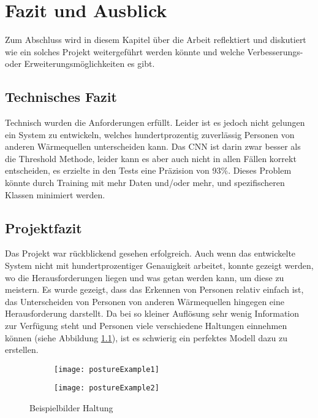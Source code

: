 \chapter{Fazit und Ausblick}
\label{ch:Ausblick}

Zum Abschluss wird in diesem Kapitel über die Arbeit reflektiert und diskutiert wie ein solches Projekt weitergeführt werden könnte und welche Verbesserungs- oder Erweiterungsmöglichkeiten es gibt.

\section{Technisches Fazit}

Technisch wurden die Anforderungen erfüllt. Leider ist es jedoch nicht gelungen ein System zu entwickeln, welches hundertprozentig zuverlässig Personen von anderen Wärmequellen unterscheiden kann. Das \gls{CNN} ist darin zwar besser als die Threshold Methode, leider kann es aber auch nicht in allen Fällen korrekt entscheiden, es erzielte in den Tests eine Präzision von 93\%. Dieses Problem könnte durch Training mit mehr Daten und/oder mehr, und spezifischeren Klassen minimiert werden.

\section{Projektfazit}

Das Projekt war rückblickend gesehen erfolgreich. Auch wenn das entwickelte System nicht mit hundertprozentiger Genauigkeit arbeitet, konnte gezeigt werden, wo die Herausforderungen liegen und was getan werden kann, um diese zu meistern. Es wurde gezeigt, dass das Erkennen von Personen relativ einfach ist, das Unterscheiden von Personen von anderen Wärmequellen hingegen eine Herausforderung darstellt. Da bei so kleiner Auflösung sehr wenig Information zur Verfügung steht und Personen viele verschiedene Haltungen einnehmen können (siehe Abbildung \ref{fig:postureExample}), ist es schwierig ein perfektes Modell dazu zu erstellen.

\begin{figure}[H]
	\centering
	\begin{subfigure}{.4\linewidth}
		\centering
		\texttt{[image: postureExample1]}
	\end{subfigure}
	\begin{subfigure}{.4\linewidth}
		\centering
		\texttt{[image: postureExample2]}
	\end{subfigure}	
	\caption{Beispielbilder Haltung}
	\label{fig:postureExample}
\end{figure}

